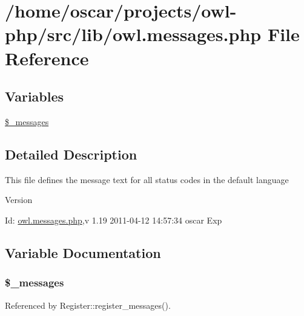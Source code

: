 \section{/home/oscar/projects/owl-\/php/src/lib/owl.messages.php File Reference}
\label{owl_8messages_8php}
\subsection*{Variables}
\begin{DoxyCompactItemize}
\item 
\hyperlink{owl_8messages_8php_a5caca00ffca4d529cdbb748a61f4b015}{\$\_\-messages}
\end{DoxyCompactItemize}


\subsection{Detailed Description}
This file defines the message text for all status codes in the default language \begin{DoxyVersion}{Version}

\end{DoxyVersion}
\begin{DoxyParagraph}{Id:}
\hyperlink{owl_8messages_8php}{owl.messages.php},v 1.19 2011-\/04-\/12 14:57:34 oscar Exp 
\end{DoxyParagraph}


\subsection{Variable Documentation}
\subsubsection[{\$\_\-messages}]{\setlength{\rightskip}{0pt plus 5cm}\$\_\-messages}\label{owl_8messages_8php_a5caca00ffca4d529cdbb748a61f4b015}


Referenced by Register::register\_\-messages().

